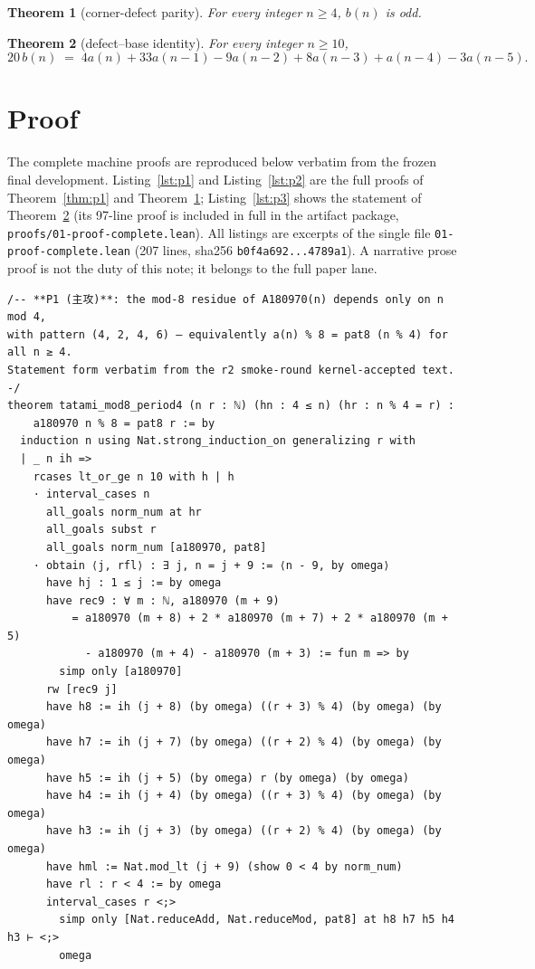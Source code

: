 \documentclass[11pt]{article}
\newtheorem{theorem}{Theorem}
\begin{document}
\begin{theorem}[corner-defect parity]\label{thm:p2}
For every integer $n \geq 4$, $b(n)$ is odd.
\end{theorem}

\begin{theorem}[defect--base identity]\label{thm:p3}
For every integer $n \geq 10$,
\[
20\,b(n) \;=\; 4a(n) + 33a(n-1) - 9a(n-2) + 8a(n-3) + a(n-4) - 3a(n-5).
\]
\end{theorem}

\section{Proof}

The complete machine proofs are reproduced below verbatim from the frozen
final development. Listing~\ref{lst:p1} and Listing~\ref{lst:p2} are the full
proofs of Theorem~\ref{thm:p1} and Theorem~\ref{thm:p2};
Listing~\ref{lst:p3} shows the statement of Theorem~\ref{thm:p3} (its
97-line proof is included in full in the artifact package,
\texttt{proofs/01-proof-complete.lean}). All listings are excerpts of the
single file \texttt{01-proof-complete.lean} (207 lines, sha256
\texttt{b0f4a692...4789a1}). A narrative prose proof is not the duty of this
note; it belongs to the full paper lane.

\begin{lstlisting}[caption={Complete proof of Theorem~\ref{thm:p1} (verbatim excerpt, lines 56--84 of \texttt{final/01-proof-complete.lean}).},label={lst:p1}]
/-- **P1 (主攻)**: the mod-8 residue of A180970(n) depends only on n mod 4,
with pattern (4, 2, 4, 6) — equivalently a(n) % 8 = pat8 (n % 4) for all n ≥ 4.
Statement form verbatim from the r2 smoke-round kernel-accepted text. -/
theorem tatami_mod8_period4 (n r : ℕ) (hn : 4 ≤ n) (hr : n % 4 = r) :
    a180970 n % 8 = pat8 r := by
  induction n using Nat.strong_induction_on generalizing r with
  | _ n ih =>
    rcases lt_or_ge n 10 with h | h
    · interval_cases n
      all_goals norm_num at hr
      all_goals subst r
      all_goals norm_num [a180970, pat8]
    · obtain ⟨j, rfl⟩ : ∃ j, n = j + 9 := ⟨n - 9, by omega⟩
      have hj : 1 ≤ j := by omega
      have rec9 : ∀ m : ℕ, a180970 (m + 9)
          = a180970 (m + 8) + 2 * a180970 (m + 7) + 2 * a180970 (m + 5)
            - a180970 (m + 4) - a180970 (m + 3) := fun m => by
        simp only [a180970]
      rw [rec9 j]
      have h8 := ih (j + 8) (by omega) ((r + 3) % 4) (by omega) (by omega)
      have h7 := ih (j + 7) (by omega) ((r + 2) % 4) (by omega) (by omega)
      have h5 := ih (j + 5) (by omega) r (by omega) (by omega)
      have h4 := ih (j + 4) (by omega) ((r + 3) % 4) (by omega) (by omega)
      have h3 := ih (j + 3) (by omega) ((r + 2) % 4) (by omega) (by omega)
      have hml := Nat.mod_lt (j + 9) (show 0 < 4 by norm_num)
      have rl : r < 4 := by omega
      interval_cases r <;>
        simp only [Nat.reduceAdd, Nat.reduceMod, pat8] at h8 h7 h5 h4 h3 ⊢ <;>
        omega
\end{lstlisting}
\end{document}
